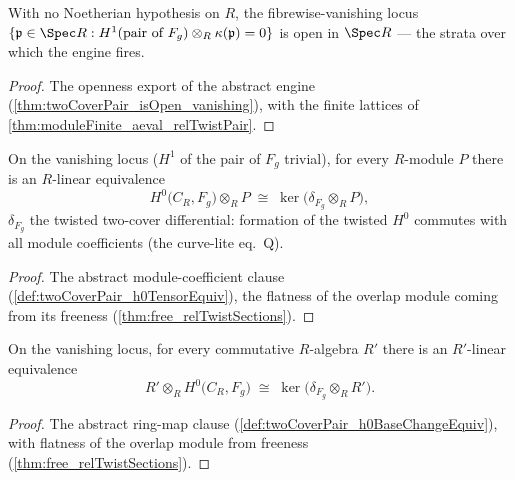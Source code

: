 \begin{theorem}
  \label{thm:relTwistRigidEngine_isOpen}
  \leanok
  With no Noetherian hypothesis on \(R\), the fibrewise-vanishing locus
  \(\{\mathfrak p \in \Spec R : H^1(\text{pair of } F_g) \otimes_R
  \kappa(\mathfrak p) = 0\}\) is open in \(\Spec R\) --- the strata over which the
  engine fires.
\end{theorem}
\begin{proof}
  \leanok
  The openness export of the abstract engine
  (\ref{thm:twoCoverPair_isOpen_vanishing}), with the finite lattices of
  \ref{thm:moduleFinite_aeval_relTwistPair}.
\end{proof}

\begin{definition}
  \label{def:relTwistH0TensorEquiv}
  \leanok
  On the vanishing locus (\(H^1\) of the pair of \(F_g\) trivial), for every
  \(R\)-module \(P\) there is an \(R\)-linear equivalence
  \[
    H^0\bigl(C_R, F_g\bigr) \otimes_R P \;\cong\;
      \ker\bigl(\delta_{F_g} \otimes_R P\bigr),
  \]
  \(\delta_{F_g}\) the twisted two-cover differential: formation of the twisted
  \(H^0\) commutes with all module coefficients (the curve-lite eq.\ Q).
\end{definition}
\begin{proof}
  \leanok
  The abstract module-coefficient clause (\ref{def:twoCoverPair_h0TensorEquiv}), the
  flatness of the overlap module coming from its freeness
  (\ref{thm:free_relTwistSections}).
\end{proof}

\begin{definition}
  \label{def:relTwistH0BaseChangeEquiv}
  \leanok
  On the vanishing locus, for every commutative \(R\)-algebra \(R'\) there is an
  \(R'\)-linear equivalence
  \[
    R' \otimes_R H^0\bigl(C_R, F_g\bigr) \;\cong\;
      \ker\bigl(\delta_{F_g} \otimes_R R'\bigr).
  \]
\end{definition}
\begin{proof}
  \leanok
  The abstract ring-map clause (\ref{def:twoCoverPair_h0BaseChangeEquiv}), with
  flatness of the overlap module from freeness (\ref{thm:free_relTwistSections}).
\end{proof}

